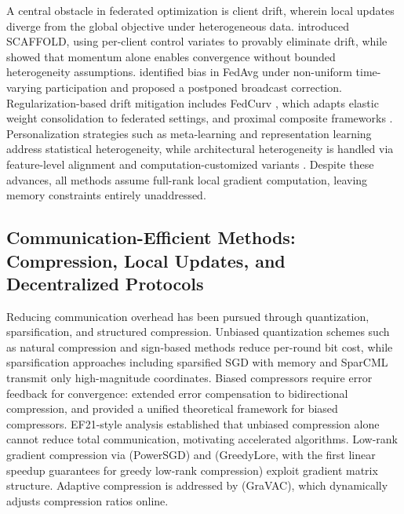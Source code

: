 \documentclass[11pt]{article}
\begin{document}
A central obstacle in federated optimization is client drift, wherein local updates diverge from the global objective under heterogeneous data. \citet{karimireddy2020scaffold} introduced SCAFFOLD, using per-client control variates to provably eliminate drift, while \citet{Cheng2023MomentumBN} showed that momentum alone enables convergence without bounded heterogeneity assumptions. \citet{xiang2023towards} identified bias in FedAvg under non-uniform time-varying participation and proposed a postponed broadcast correction. Regularization-based drift mitigation includes FedCurv \citep{shoham2019overcoming}, which adapts elastic weight consolidation to federated settings, and proximal composite frameworks \citep{yuan2020federated, Zhou2025FedCanonNC}. Personalization strategies such as meta-learning \citep{reguieg2023comparative} and representation learning \citep{collins2022fedavg} address statistical heterogeneity, while architectural heterogeneity is handled via feature-level alignment \citep{Yu2020HeterogeneousFL} and computation-customized variants \citep{Zhang2022CCFedAvgCC}. Despite these advances, all methods assume full-rank local gradient computation, leaving memory constraints entirely unaddressed.

\subsection{Communication-Efficient Methods: Compression, Local Updates, and Decentralized Protocols}

Reducing communication overhead has been pursued through quantization, sparsification, and structured compression. Unbiased quantization schemes such as natural compression \citep{horvoth2022natural} and sign-based methods \citep{Bernstein2018signSGDCO} reduce per-round bit cost, while sparsification approaches including sparsified SGD with memory \citep{stich2018sparsified} and SparCML \citep{Renggli2018SparCMLHS} transmit only high-magnitude coordinates. Biased compressors require error feedback for convergence: \citet{Tang2019DoubleSqueezePS} extended error compensation to bidirectional compression, and \citet{beznosikov2023biased} provided a unified theoretical framework for biased compressors. EF21-style analysis \citep{He2023UnbiasedCS} established that unbiased compression alone cannot reduce total communication, motivating accelerated algorithms. Low-rank gradient compression via \citet{Vogels2019PowerSGDPL} (PowerSGD) and \citet{chen2025greedy} (GreedyLore, with the first linear speedup guarantees for greedy low-rank compression) exploit gradient matrix structure. Adaptive compression is addressed by \citet{Tyagi2023GraVACAC} (GraVAC), which dynamically adjusts compression ratios online.
\end{document}
